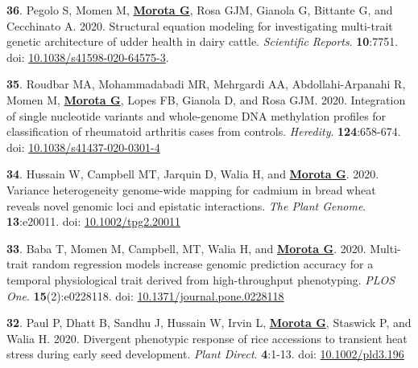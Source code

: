 \documentclass[margin,line,10pt]{res}
\newenvironment{list1}{
  \begin{list}{\ding{113}}{%
      \setlength{\itemsep}{0in}
      \setlength{\parsep}{0in} \setlength{\parskip}{0in}
      \setlength{\topsep}{0in} \setlength{\partopsep}{0in} 
      \setlength{\leftmargin}{0.17in}}}{\end{list}}
\begin{document}
\begin{resume}
\begin{list1}
  \vspace{0.5cm}

    
\item [{\bf 36}.] Pegolo S, Momen M, \textbf{\underline{Morota G}}, Rosa GJM, Gianola G, Bittante G, and Cecchinato A. 2020. Structural equation modeling for investigating multi-trait genetic architecture of udder health in dairy cattle. \emph{Scientific Reports}. \textbf{10}:7751. doi: \textcolor{blue}{\href{https://doi.org/10.1038/s41598-020-64575-3}{10.1038/s41598-020-64575-3}}. 

  \vspace{0.5cm}

\item  [{\bf 35}.] Roudbar MA, Mohammadabadi MR, Mehrgardi AA, Abdollahi-Arpanahi R,  Momen M, \textbf{\underline{Morota G}}, Lopes FB, Gianola D, and Rosa GJM. 2020. Integration of single nucleotide variants and whole-genome DNA methylation profiles for classification of rheumatoid arthritis cases from controls. \emph{Heredity}. \textbf{124}:658-674. doi: \textcolor{blue}{\href{https://doi.org/10.1038/s41437-020-0301-4}{10.1038/s41437-020-0301-4}} 
  
      \vspace{0.5cm}

  \item  [{\bf 34}.]  Hussain W, Campbell MT, Jarquin D, Walia H, and \textbf{\underline{Morota G}}. 2020. Variance heterogeneity genome-wide mapping for cadmium in bread wheat reveals novel genomic loci and epistatic interactions. \emph{The Plant Genome}. \textbf{13}:e20011. doi: \textcolor{blue}{\href{https://doi.org/10.1002/tpg2.20011}{10.1002/tpg2.20011}}

    \vspace{0.5cm}
    
  \item  [{\bf 33}.] Baba T, Momen M, Campbell, MT, Walia H, and \textbf{\underline{Morota G}}. 2020. Multi-trait random regression models increase genomic prediction accuracy for a temporal physiological trait derived from high-throughput phenotyping. \emph{PLOS One}. \textbf{15}(2):e0228118. doi: \textcolor{blue}{\href{https://doi.org/10.1371/journal.pone.0228118}{10.1371/journal.pone.0228118}}
  
  \vspace{0.5cm}

\item [{\bf 32}.] Paul P, Dhatt B, Sandhu J, Hussain W, Irvin L, \textbf{\underline{Morota G}}, Staswick P, and Walia H. 2020. Divergent phenotypic response of rice accessions to transient heat stress during early seed development. \emph{Plant Direct}. \textbf{4}:1-13. doi: \textcolor{blue}{\href{https://doi.org/10.1002/pld3.196}{10.1002/pld3.196}}


\end{list1}
\end{resume}
\end{document}
